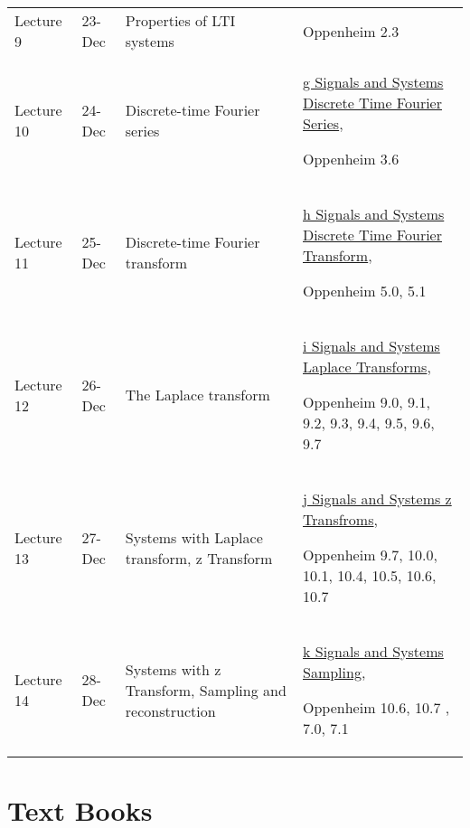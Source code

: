 \documentclass[11pt, a4paper]{article}
\begin{document}
\begin{tabular}{@{}llp{2in}p{3in}@{}}
Lecture 9	&	23-Dec	&	Properties of LTI systems	&	 \par	Oppenheim 2.3	\\
Lecture 10	&	24-Dec	&	Discrete-time Fourier series	&	\href{https://github.com/rangarodrigo/EN1060Lectures/blob/master/g\%20Signals\%20and\%20Systems\%20Discrete\%20Time\%20Fourier\%20Series.pdf	}{g Signals and Systems Discrete Time Fourier Series}, \par	Oppenheim 3.6	\\
Lecture 11	&	25-Dec	&	Discrete-time Fourier transform	&	\href{https://github.com/rangarodrigo/EN1060Lectures/blob/master/h\%20Signals\%20and\%20Systems\%20Discrete\%20Time\%20Fourier\%20Transform.pdf	}{h Signals and Systems Discrete Time Fourier Transform}, \par	Oppenheim 5.0, 5.1	\\
Lecture 12	&	26-Dec	&	The Laplace transform	&	\href{https://github.com/rangarodrigo/EN1060Lectures/blob/master/i\%20Signals\%20and\%20Systems\%20Laplace\%20Transforms.pdf	}{i Signals and Systems Laplace Transforms}, \par	Oppenheim 9.0, 9.1, 9.2, 9.3, 9.4, 9.5, 9.6, 9.7	\\
Lecture 13	&	27-Dec	&	Systems with Laplace transform, z Transform	&	\href{https://github.com/rangarodrigo/EN1060Lectures/blob/master/j\%20Signals\%20and\%20Systems\%20z\%20Transfroms.pdf	}{j Signals and Systems z Transfroms}, \par	Oppenheim 9.7,  10.0, 10.1, 10.4, 10.5, 10.6, 10.7	\\
Lecture 14	&	28-Dec	&	Systems with z Transform, Sampling and reconstruction	&	\href{https://github.com/rangarodrigo/EN1060Lectures/blob/master/k\%20Signals\%20and\%20Systems\%20Sampling.pdf}{	k Signals and Systems Sampling}, \par	Oppenheim 10.6, 10.7 , 7.0, 7.1	\\
\bottomrule
\end{tabular}

\section{Text Books}
\nocite{OPPENH97}
\nocite{HSUHWE95}
\vspace{-0.5in}


\end{document}
